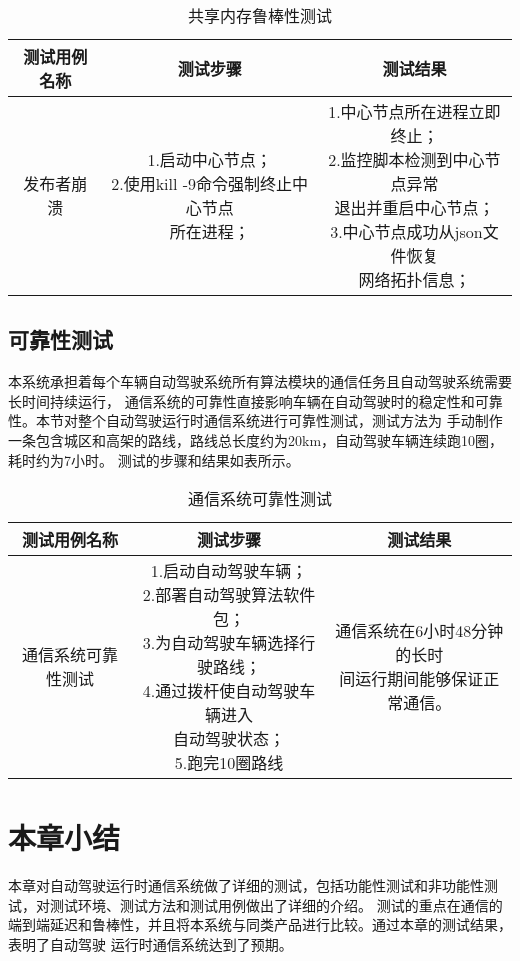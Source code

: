 \begin{table}[H]
  \centering\small
  \caption{共享内存鲁棒性测试}
  \renewcommand\arraystretch{1.2}
  \label{master_robust}
  \begin{tabular}{ccc}
    \toprule
    测试用例名称 & 测试步骤 & 测试结果 \\
    \midrule
    发布者崩溃 & \makecell[l]{1.启动中心节点；\\2.使用kill -9命令强制终止中心节点\\所在进程；} & \makecell[l]{1.中心节点所在进程立即终止；\\2.监控脚本检测到中心节点异常\\退出并重启中心节点；\\3.中心节点成功从json文件恢复\\网络拓扑信息；}\\
    \bottomrule
  \end{tabular}
\end{table}

\subsection{可靠性测试}
本系统承担着每个车辆自动驾驶系统所有算法模块的通信任务且自动驾驶系统需要长时间持续运行，
通信系统的可靠性直接影响车辆在自动驾驶时的稳定性和可靠性。本节对整个自动驾驶运行时通信系统进行可靠性测试，测试方法为
手动制作一条包含城区和高架的路线，路线总长度约为20km，自动驾驶车辆连续跑10圈，耗时约为7小时。
测试的步骤和结果如表所示。

\begin{table}[H]
  \centering\small
  \caption{通信系统可靠性测试}
  \renewcommand\arraystretch{1.2}
  \label{master_robust}
  \begin{tabular}{ccc}
    \toprule
    测试用例名称 & 测试步骤 & 测试结果 \\
    \midrule
    通信系统可靠性测试 & \makecell[l]{1.启动自动驾驶车辆；\\2.部署自动驾驶算法软件包；\\3.为自动驾驶车辆选择行驶路线；\\4.通过拨杆使自动驾驶车辆进入\\自动驾驶状态；\\5.跑完10圈路线} & \makecell[l]{通信系统在6小时48分钟的长时\\间运行期间能够保证正常通信。\\}\\
    \bottomrule
  \end{tabular}
\end{table}

\section{本章小结}
本章对自动驾驶运行时通信系统做了详细的测试，包括功能性测试和非功能性测试，对测试环境、测试方法和测试用例做出了详细的介绍。
测试的重点在通信的端到端延迟和鲁棒性，并且将本系统与同类产品进行比较。通过本章的测试结果，表明了自动驾驶
运行时通信系统达到了预期。
